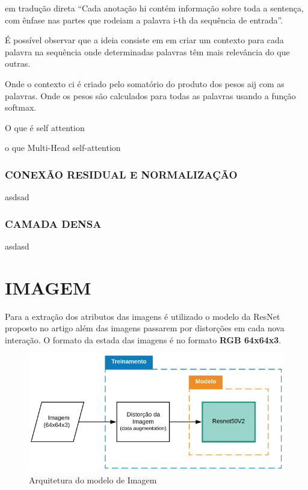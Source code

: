 

em tradução direta “Cada anotação hi contém informação sobre toda a sentença, com ênfase nas partes que rodeiam a palavra i-th da sequência de entrada”.

É possível observar que a ideia consiste em em criar um contexto para cada palavra na sequência onde determinadas palavras têm mais relevância do que outras.

Onde o contexto ci é criado pelo somatório do produto dos pesos aij com as palavras. Onde os pesos são calculados para todas as palavras usando a função softmax.

O que é self attention

o que Multi-Head self-attention


\subsubsection{CONEXÃO RESIDUAL E NORMALIZAÇÃO}
asdsad

\subsubsection{CAMADA DENSA}
asdasd


\section{IMAGEM}

Para a extração dos atributos das imagens é utilizado o modelo da ResNet proposto no artigo \cite{resnet} além das imagens passarem por distorções em cada nova interação. O formato da estada das imagens é no formato \textbf{RGB 64x64x3}.

\begin{figure}[]
	\caption{\label{modelo_imagem_macro} Arquitetura do modelo de Imagem}
	\begin{center}
	    \includegraphics[scale=0.5]{artigo/recursos/imagens/modelo_imagem_macro.png}
	\end{center}
\end{figure}


